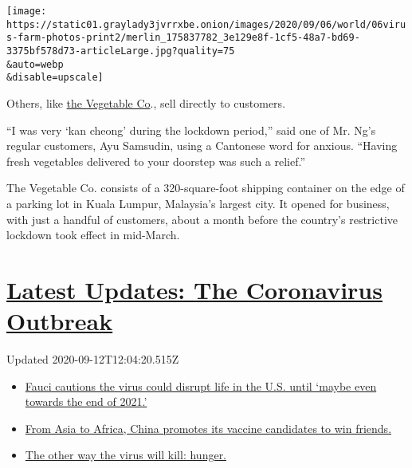 \texttt{[image: https://static01.graylady3jvrrxbe.onion/images/2020/09/06/world/06virus-farm-photos-print2/merlin\_175837782\_3e129e8f-1cf5-48a7-bd69-3375bf578d73-articleLarge.jpg?quality=75\\\&auto=webp\\\&disable=upscale]}

Others, like
\href{https://www.facebookcorewwwi.onion/thevegetable.co/about/?ref=page_internal}{the
Vegetable Co}., sell directly to customers.

``I was very `kan cheong' during the lockdown period,'' said one of Mr.
Ng's regular customers, Ayu Samsudin, using a Cantonese word for
anxious. ``Having fresh vegetables delivered to your doorstep was such a
relief.''

The Vegetable Co. consists of a 320-square-foot shipping container on
the edge of a parking lot in Kuala Lumpur, Malaysia's largest city. It
opened for business, with just a handful of customers, about a month
before the country's restrictive lockdown took effect in mid-March.

\hypertarget{latest-updates-the-coronavirus-outbreak}{%
\section{\texorpdfstring{\href{https://www.nytimes3xbfgragh.onion/2020/09/11/world/covid-19-coronavirus.html?action=click\&pgtype=Article\&state=default\&region=MAIN_CONTENT_1\&context=storylines_live_updates}{Latest
Updates: The Coronavirus
Outbreak}}{Latest Updates: The Coronavirus Outbreak}}\label{latest-updates-the-coronavirus-outbreak}}

Updated 2020-09-12T12:04:20.515Z

\begin{itemize}
\tightlist
\item
  \href{https://www.nytimes3xbfgragh.onion/2020/09/11/world/covid-19-coronavirus.html?action=click\&pgtype=Article\&state=default\&region=MAIN_CONTENT_1\&context=storylines_live_updates\#link-dfb8a16}{Fauci
  cautions the virus could disrupt life in the U.S. until `maybe even
  towards the end of 2021.'}
\item
  \href{https://www.nytimes3xbfgragh.onion/2020/09/11/world/covid-19-coronavirus.html?action=click\&pgtype=Article\&state=default\&region=MAIN_CONTENT_1\&context=storylines_live_updates\#link-7104d154}{From
  Asia to Africa, China promotes its vaccine candidates to win friends.}
\item
  \href{https://www.nytimes3xbfgragh.onion/2020/09/11/world/covid-19-coronavirus.html?action=click\&pgtype=Article\&state=default\&region=MAIN_CONTENT_1\&context=storylines_live_updates\#link-393ad215}{The
  other way the virus will kill: hunger.}
\end{itemize}

